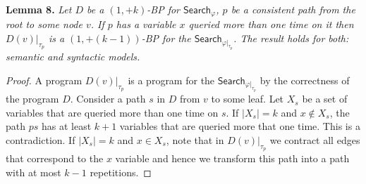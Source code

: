\documentclass[10pt,a4paper]{article}
\newcommand{\Search}{\mathsf{Search}}
\newenvironment{result}[1]{\par\medskip\noindent\textbf{#1.}\itshape}{\par\medskip}
\begin{document}
\begin{result}{Lemma 8}
Let $D$ be a $(1,+k)$-BP for $\Search_\varphi$, $p$ be a consistent path from the root to some node $v$. If $p$ has a variable $x$ queried more than one time on it then $D(v)|_{\tau_p}$ is a $(1,+(k-1))$-BP for the $\Search_{\varphi|_{\tau_p}}$. The result holds for both: semantic and syntactic models.
\end{result}
\begin{proof}
A program $D(v)|_{\tau_p}$ is a program for the $\Search_{\varphi|_{\tau_p}}$ by the correctness of the program $D$. Consider a path $s$ in $D$ from $v$ to some leaf. Let $X_s$ be a set of variables that are queried more than one time on $s$. If $|X_s|=k$ and $x\notin X_s$, the path $ps$ has at least $k+1$ variables that are queried more that one time. This is a contradiction. If $|X_s|=k$ and $x\in X_s$, note that in $D(v)|_{\tau_p}$ we contract all edges that correspond to the $x$ variable and hence we transform this path into a path with at most $k-1$ repetitions.
\end{proof}
\end{document}
